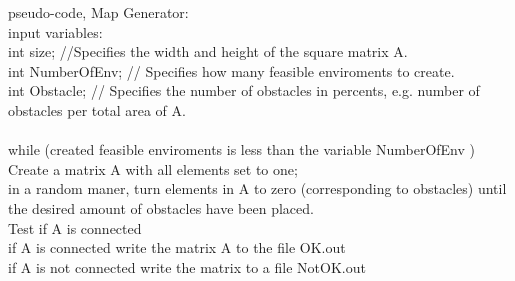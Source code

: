 pseudo-code, Map Generator:\\
input variables:\\
int size; //Specifies the width and height of the square matrix  A.\\
int NumberOfEnv; // Specifies how many feasible enviroments to create.\\
int Obstacle; //  Specifies the number of obstacles in percents, e.g. number of obstacles per total area of A.\\
\\
while (created feasible enviroments is less than the variable NumberOfEnv )\\
	Create a matrix A with all elements set to one; \\
	in a random maner, turn elements in A to zero (corresponding to obstacles) until the desired amount of obstacles have been placed.\\
	Test if A is connected\\
	if A is connected write the matrix A to the file OK.out\\
	if A is not connected write the matrix to a file NotOK.out\\


